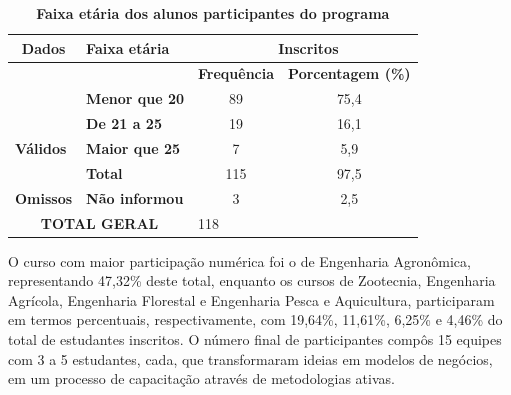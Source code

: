 \begin{table}[H]
\centering
\caption{\textbf{Faixa etária dos alunos participantes do programa}}
\label{tabela_45}
\begin{tabular}{clcc} 
\hline\hline
 \textbf{Dados}                       & \textbf{Faixa etária}  & \multicolumn{2}{c}{~\textbf{Inscritos} }                                                        \\ 
\hline
\multirow{3}{*}{}                     &                        & \multicolumn{1}{l}{\textbf{Frequência} } & \multicolumn{1}{l}{\textbf{Porcentagem (\%)} }  \\
                                      & \textbf{Menor que 20}  & 89                                            & 75,4                                            \\
                                      & \textbf{De 21 a 25}    & 19                                            & 16,1                                            \\
\multicolumn{1}{l}{\textbf{Válidos} } & \textbf{Maior que 25}  & 7                                             & 5,9                                             \\
\multicolumn{1}{l}{}                  & \textbf{Total}         & 115                                           & 97,5                                            \\ 
\hline
\multicolumn{1}{l}{\textbf{Omissos} } & \textbf{Não informou}  & 3                                             & 2,5                                             \\ 
\hline
\multicolumn{2}{c}{\textbf{TOTAL GERAL} }                      & \multicolumn{1}{l}{118}                       &                                                 \\
\hline\hline
\end{tabular}
\end{table}


O curso com maior participação numérica foi o de Engenharia Agronômica, representando 47,32\% deste total, enquanto os cursos de Zootecnia, Engenharia Agrícola, Engenharia Florestal e Engenharia Pesca e Aquicultura, participaram em termos percentuais, respectivamente, com 19,64\%, 11,61\%, 6,25\% e 4,46\% do total de estudantes inscritos. O número final de participantes compôs 15 equipes com 3 a 5 estudantes, cada, que transformaram ideias em modelos de negócios, em um processo de capacitação através de metodologias ativas. 

